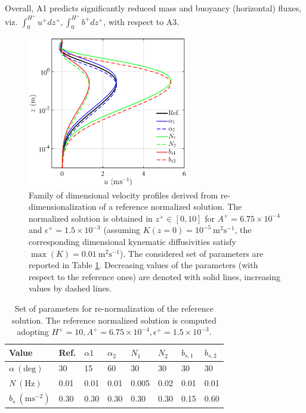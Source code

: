 Overall, A1 predicts significantly reduced mass and buoyancy (horizontal) fluxes, viz. $\int_0^{H^+}{u^+}{dz^+},\int_0^{H^+}{b^+}{dz^+}$, with respect to A3.
%
%
\begin{figure}
    \begin{center}
    \includegraphics[width= 70.0mm]{./u_dim_alpha_N_b}
    \caption{Family of dimensional velocity profiles derived from re-dimensionalization of a reference normalized solution. The normalized solution is obtained in $z^+ \in [0,10]$ for $A^+ = 6.75 \times 10^{-4}$ and $\epsilon^+ =1.5 \times 10^{-3}$ (assuming $K(z=0) = 10^{-5}  \ \mathrm{m^2s^{-1}}$, the corresponding dimensional kynematic diffusivities satisfy $\max{(K)}=0.01 \ \mathrm{m^2s^{-1}}$). The considered set of parameters are reported in Table \ref{table}. Decreasing values of the parameters (with respect to the reference ones) are denoted with solid lines, increasing values by dashed lines.}
    \label{fig2}
    \end{center}
\end{figure}
%
\begin{table}
\caption{Set of parameters for re-normalization of the reference solution. The reference normalized solution is computed adopting $H^+ = 10, A^+ = 6.75 \times 10^{-4}, \epsilon^+ =1.5 \times 10^{-3}$.}
\label{table}
\centering
\begin{tabular}{l l l l l l l l}
\hline
 Value & Ref. & $\alpha1$ & $\alpha_2$ & $N_1$ & $N_2$ & $b_{s,1}$ & $b_{s,2}$ \\
\hline
   $\alpha \ (\mathrm{deg})$ & 30 & 15 & 60 & 30 & 30 & 30 & 30  \\
   $N \ (\mathrm{Hz})$ & 0.01 & 0.01 & 0.01 & 0.005 & 0.02 & 0.01 & 0.01 \\
   $b_s \ (\mathrm{ms^{-2}})$ & 0.30 & 0.30 & 0.30 & 0.30 & 0.30 & 0.15 & 0.60 \\
\hline
\end{tabular}
\end{table}
